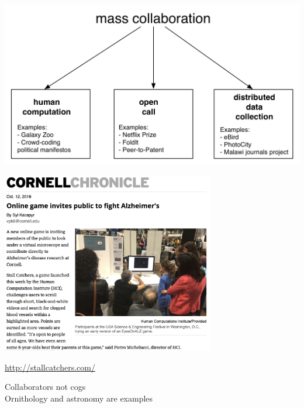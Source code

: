 \documentclass[aspectratio=169]{beamer}
\begin{document}
\begin{frame}

\begin{center}
\includegraphics[width=\textwidth]{figures/mass_collaboration_schematic}
\end{center}

\end{frame}
\begin{frame}

\begin{center}
\includegraphics[width=0.7\textwidth]{figures/stall_catchers}
\end{center}

\end{frame}
\begin{frame}

\url{http://stallcatchers.com/}

\end{frame}
\begin{frame}

Collaborators not cogs\\
\pause
Ornithology and astronomy are examples\\

\end{frame}
\end{document}
